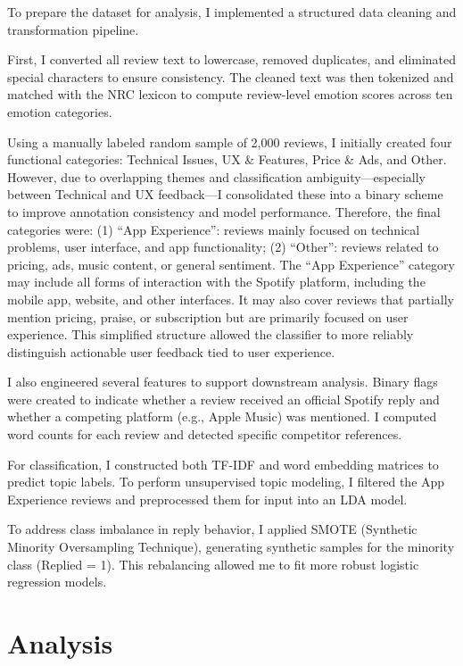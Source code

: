 \documentclass[
  11pt,
]{article}
\begin{document}
To prepare the dataset for analysis, I implemented a structured data
cleaning and transformation pipeline.

First, I converted all review text to lowercase, removed duplicates, and
eliminated special characters to ensure consistency. The cleaned text
was then tokenized and matched with the NRC lexicon to compute
review-level emotion scores across ten emotion categories.

Using a manually labeled random sample of 2,000 reviews, I initially
created four functional categories: Technical Issues, UX \& Features,
Price \& Ads, and Other. However, due to overlapping themes and
classification ambiguity---especially between Technical and UX
feedback---I consolidated these into a binary scheme to improve
annotation consistency and model performance. Therefore, the final
categories were: (1) ``App Experience'': reviews mainly focused on
technical problems, user interface, and app functionality; (2)
``Other'': reviews related to pricing, ads, music content, or general
sentiment. The ``App Experience'' category may include all forms of
interaction with the Spotify platform, including the mobile app,
website, and other interfaces. It may also cover reviews that partially
mention pricing, praise, or subscription but are primarily focused on
user experience. This simplified structure allowed the classifier to
more reliably distinguish actionable user feedback tied to user
experience.

I also engineered several features to support downstream analysis.
Binary flags were created to indicate whether a review received an
official Spotify reply and whether a competing platform (e.g., Apple
Music) was mentioned. I computed word counts for each review and
detected specific competitor references.

For classification, I constructed both TF-IDF and word embedding
matrices to predict topic labels. To perform unsupervised topic
modeling, I filtered the App Experience reviews and preprocessed them
for input into an LDA model.

To address class imbalance in reply behavior, I applied SMOTE (Synthetic
Minority Oversampling Technique), generating synthetic samples for the
minority class (Replied = 1). This rebalancing allowed me to fit more
robust logistic regression models.

\hypertarget{analysis}{%
\section{Analysis}\label{analysis}}
\end{document}
